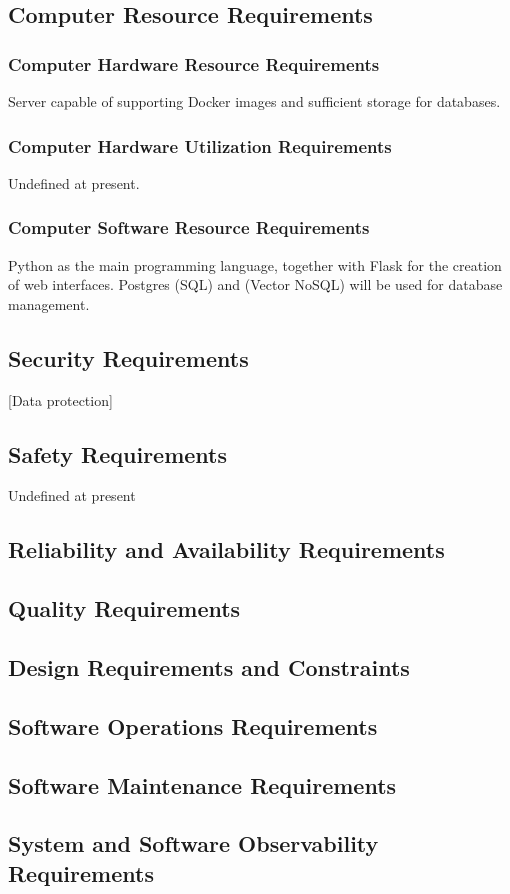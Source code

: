 \documentclass[12pt,a4paper]{article}
\begin{document}
\subsection{Computer Resource Requirements}
\subsubsection{Computer Hardware Resource Requirements}
Server capable of supporting Docker images and sufficient storage for databases.
\subsubsection{Computer Hardware Utilization Requirements}
Undefined at present.
\subsubsection{Computer Software Resource Requirements}
Python as the main programming language, together with 
Flask for the creation of web interfaces. Postgres (SQL) and 
(Vector NoSQL) will be used for database management.
\subsection{Security Requirements}
[Data protection]
\subsection{Safety Requirements}
Undefined at present
\subsection{Reliability and Availability Requirements}
\subsection{Quality Requirements}
\subsection{Design Requirements and Constraints}
\subsection{Software Operations Requirements}
\subsection{Software Maintenance Requirements}
\subsection{System and Software Observability Requirements}
\end{document}
